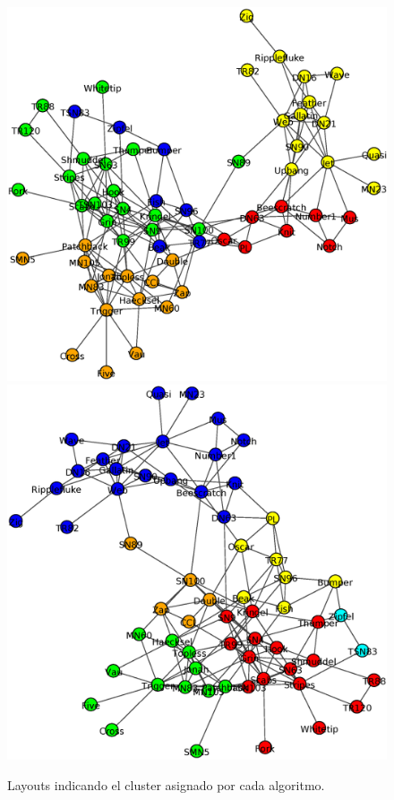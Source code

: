 \begin{figure}
\includegraphics[scale = 0.2]{Louvain}
\includegraphics[scale = 0.2]{Infomap}
\caption{Layouts indicando el cluster asignado por cada algoritmo.}
\label{fig:Layouts_clusters}
\end{figure}

